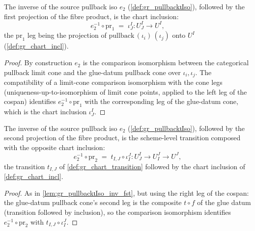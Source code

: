\begin{lemma}

  \label{lem:gr_pullbackιIso_inv_fst}
  The inverse of the source pullback iso \(e_2\) (\cref{def:gr_pullbackιIso}),
  followed by the first projection of the fibre product, is the chart inclusion:
  \[
    e_2^{-1} \circ \mathrm{pr}_1 \;=\; \iota^I_J : U^I_J \to U^I ,
  \]
  the \(\mathrm{pr}_1\) leg being the projection of
  \(\mathrm{pullback}\,(\iota_i)\,(\iota_j)\) onto \(U^I\)
  (\cref{def:gr_chart_incl}).
\end{lemma}
\begin{proof}
  \leanok
  By construction \(e_2\) is the comparison isomorphism between the categorical
  pullback limit cone and the glue-datum pullback cone over \(\iota_i, \iota_j\).
  The compatibility of a limit-cone comparison isomorphism with the cone legs
  (uniqueness-up-to-isomorphism of limit cone points, applied to the left leg of
  the cospan) identifies \(e_2^{-1} \circ \mathrm{pr}_1\) with the corresponding
  leg of the glue-datum cone, which is the chart inclusion \(\iota^I_J\).
\end{proof}

\begin{lemma}

  \label{lem:gr_pullbackιIso_inv_snd}
  The inverse of the source pullback iso \(e_2\) (\cref{def:gr_pullbackιIso}),
  followed by the second projection of the fibre product, is the scheme-level
  transition composed with the opposite chart inclusion:
  \[
    e_2^{-1} \circ \mathrm{pr}_2
      \;=\; t_{I,J} \circ \iota^J_I : U^I_J \to U^J_I \to U^J ,
  \]
  the transition \(t_{I,J}\) of \cref{def:gr_chart_transition} followed by the
  chart inclusion of \cref{def:gr_chart_incl}.
\end{lemma}
\begin{proof}
  \leanok
  As in \cref{lem:gr_pullbackιIso_inv_fst}, but using the right leg of the cospan:
  the glue-datum pullback cone's second leg is the composite \(t \circ f\) of the
  glue datum (transition followed by inclusion), so the comparison isomorphism
  identifies \(e_2^{-1} \circ \mathrm{pr}_2\) with \(t_{I,J} \circ \iota^J_I\).
\end{proof}

